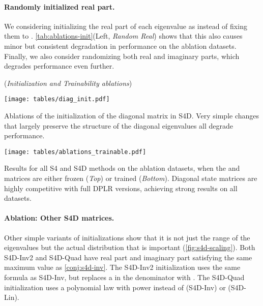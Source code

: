 \documentclass{article}
\newcommand{\para}[1]{\paragraph{#1}}
\begin{document}
\para{Randomly initialized real part.}

We considering initializing the real part of each eigenvalue as  instead of fixing them to .
\cref{tab:ablations-init}(Left, \emph{Random Real}) shows that this also causes minor but consistent degradation in performance on the ablation datasets.
Finally, we also consider randomizing both real and imaginary parts, which degrades performance even further.


\begin{table}[!t]
\caption{(\textit{Initialization and Trainability ablations})}
\begin{subtable}{.40\linewidth}\centering
  \texttt{[image: tables/diag\_init.pdf]}
  \caption{
    Ablations of the initialization of the diagonal  matrix in S4D.
    Very simple changes that largely preserve the structure of the diagonal eigenvalues all degrade performance.
  }
  \label{tab:ablations-init}
\end{subtable}
\begin{subtable}{.60\linewidth}\centering
  \texttt{[image: tables/ablations\_trainable.pdf]}
  \caption{
    Results for all S4 and S4D methods on the ablation datasets, when the  and  matrices are either frozen (\emph{Top}) or trained (\emph{Bottom}).
    Diagonal state matrices are highly competitive with full DPLR versions, achieving strong results on all datasets.
  }
  \label{tab:ablations-trainable}
\end{subtable}
\vspace*{-1.5em}
\end{table}


\para{Ablation: Other S4D matrices.}

Other simple variants of initializations show that it is not just the range of the eigenvalues but the actual distribution that is important (\cref{fig:s4d-scaling}).
Both S4D-Inv2 and S4D-Quad have real part  and imaginary part satisfying the same maximum value as \cref{conj:s4d-inv}.
The S4D-Inv2 initialization uses the same formula as S4D-Inv, but replaces a  in the denominator with .
The S4D-Quad initialization uses a polynomial law with power  instead of  (S4D-Inv) or  (S4D-Lin).
\begin{minipage}{.5\linewidth}\noindent
  
\end{minipage}\begin{minipage}{.5\linewidth}\vspace*{8pt}
  
\end{minipage}
\end{document}
